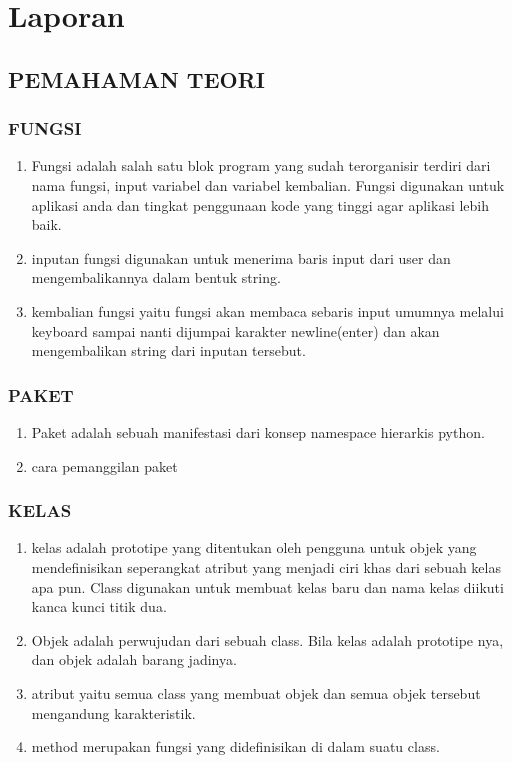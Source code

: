 \chapter{Laporan}
\section{PEMAHAMAN TEORI}
\subsection{FUNGSI}
\begin{enumerate}
	\item Fungsi adalah salah satu blok program yang sudah terorganisir terdiri dari nama fungsi, input variabel dan variabel kembalian. Fungsi digunakan untuk aplikasi anda dan tingkat penggunaan kode yang tinggi agar aplikasi lebih baik.
	\item inputan fungsi digunakan untuk menerima baris input dari user dan mengembalikannya dalam bentuk string.
	\item kembalian fungsi yaitu fungsi akan membaca sebaris input umumnya melalui keyboard sampai nanti dijumpai karakter newline(enter) dan akan mengembalikan string dari inputan tersebut.  
\end{enumerate}


\subsection{PAKET}
\begin{enumerate}
\item Paket adalah sebuah manifestasi dari konsep namespace hierarkis python.
\item cara pemanggilan paket  

\end{enumerate}

\subsection{KELAS}
\begin{enumerate}
\item kelas adalah prototipe yang ditentukan oleh pengguna untuk objek yang mendefinisikan seperangkat atribut yang menjadi ciri khas dari sebuah kelas apa pun. Class digunakan untuk membuat kelas baru dan nama kelas diikuti kanca kunci titik dua. 
\item Objek adalah perwujudan dari sebuah class. Bila kelas adalah prototipe nya, dan objek adalah barang jadinya. 
\item atribut yaitu semua class yang membuat objek dan semua objek tersebut mengandung karakteristik.
\item method merupakan fungsi yang didefinisikan di dalam suatu class.
\end{enumerate}

